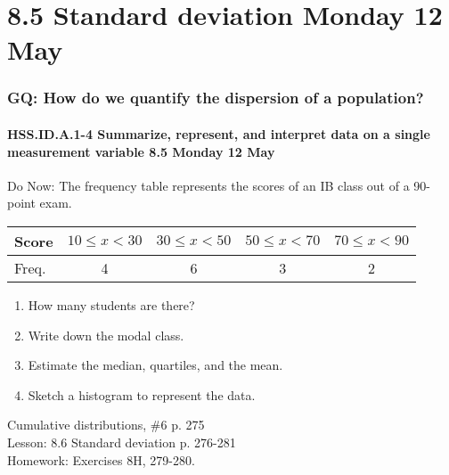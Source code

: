 \documentclass{beamer}
\begin{document}
\section{8.5 Standard deviation Monday 12 May}
  \frame
  {
    \frametitle{GQ: How do we quantify the dispersion of a population?}
    \framesubtitle{HSS.ID.A.1-4 Summarize, represent, and interpret data on a single measurement variable \hfill \alert{8.5 Monday 12 May}}

    \begin{block}{Do Now: The frequency table represents the scores of an IB class out of a 90-point exam.}
        \begin{tabular}{|l|c|c|c|c|}
          \hline
          Score & $10 \leq x<30$ &
            $30 \leq x<50$ & $50 \leq x<70$ & $70 \leq x<90$\\
          \hline
          Freq. & 4 & 6 & 3 & 2\\
          \hline
        \end{tabular}
        \begin{enumerate}
          \item How many students are there?
          \item Write down the modal class.
          \item Estimate the median, quartiles, and the mean.
          \item Sketch a histogram to represent the data.
      \end{enumerate}
    \end{block}
    Cumulative distributions, \#6 p. 275\\
    Lesson: 8.6 Standard deviation p. 276-281\\[0.5cm]
    Homework: Exercises 8H, 279-280.
  }
\end{document}
